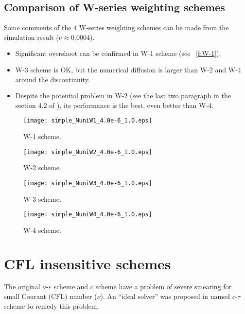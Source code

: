 \documentclass[letterpaper,12pt,dvips]{article}
\numberwithin{equation}{section}
\begin{document}
\subsection{Comparison of W-series weighting schemes}

Some comments of the 4 W-series weighting schemes can be made from the 
simulation result ($\nu\approx0.0004$).
\begin{itemize}
  \item Significant overshoot can be confirmed\cite{b:chang03} in W-1 
        scheme (see \figurename~\ref{f:W-1}).
  \item W-3 scheme is OK, but the numerical diffusion is larger than 
        W-2 and W-4 around the discontinuity.
  \item Despite the potential problem in W-2 (see the last two paragraph 
        in the section 4.2 of \cite{b:chang03}), its performance is the 
        best, even better than W-4.
\end{itemize}

\begin{figure}[htbp]
\centering
\texttt{[image: simple\_NuniW1\_4.0e-6\_1.0.eps]}
\caption{W-1 scheme.}
\label{f:W-1}
\texttt{[image: simple\_NuniW2\_4.0e-6\_1.0.eps]}
\caption{W-2 scheme.}
\label{f:W-2}
\end{figure}

\begin{figure}[htbp]
\centering
\texttt{[image: simple\_NuniW3\_4.0e-6\_1.0.eps]}
\caption{W-3 scheme.}
\label{f:W-3}
\texttt{[image: simple\_NuniW4\_4.0e-6\_1.0.eps]}
\caption{W-4 scheme.}
\label{f:W-4}
\end{figure}

\section{CFL insensitive schemes}
\label{s:ctau}

The original $a$-$\varepsilon$ scheme and $c$ scheme have a problem of 
severe smearing for small Courant (CFL) number ($\nu$).
An ``ideal solver'' was proposed in \cite{b:chang03} named $c$-$\tau$ 
scheme to remedy this problem.
\end{document}
